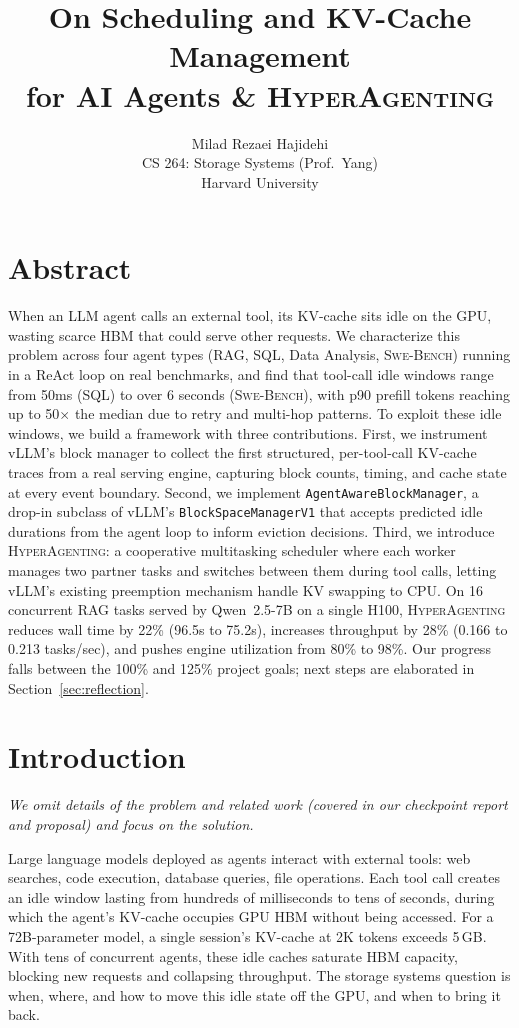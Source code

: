 \documentclass[10pt,twocolumn]{article}
\title{\vspace{-1.2cm}\textbf{On Scheduling and KV-Cache Management\\for AI Agents \& \textsc{HyperAgenting}}\vspace{-0.3cm}}
\author{Milad Rezaei Hajidehi\\ CS 264: Storage Systems (Prof.\ Yang) \\ Harvard University}
\date{}
\begin{document}
\maketitle
\thispagestyle{empty}

\section*{Abstract}

When an LLM agent calls an external tool, its KV-cache sits idle on the GPU, wasting scarce HBM that could serve other requests. We characterize this problem across four agent types (RAG, SQL, Data Analysis, \textsc{Swe-Bench}) running in a ReAct loop on real benchmarks, and find that tool-call idle windows range from 50ms (SQL) to over 6 seconds (\textsc{Swe-Bench}), with p90 prefill tokens reaching up to 50$\times$ the median due to retry and multi-hop patterns. To exploit these idle windows, we build a framework with three contributions. First, we instrument vLLM's block manager to collect the first structured, per-tool-call KV-cache traces from a real serving engine, capturing block counts, timing, and cache state at every event boundary. Second, we implement \texttt{AgentAwareBlockManager}, a drop-in subclass of vLLM's \texttt{BlockSpaceManagerV1} that accepts predicted idle durations from the agent loop to inform eviction decisions. Third, we introduce \textsc{HyperAgenting}: a cooperative multitasking scheduler where each worker manages two partner tasks and switches between them during tool calls, letting vLLM's existing preemption mechanism handle KV swapping to CPU. On 16 concurrent RAG tasks served by Qwen~2.5-7B on a single H100, \textsc{HyperAgenting} reduces wall time by 22\% (96.5s to 75.2s), increases throughput by 28\% (0.166 to 0.213 tasks/sec), and pushes engine utilization from 80\% to 98\%. Our progress falls between the 100\% and 125\% project goals; next steps are elaborated in Section~\ref{sec:reflection}.

\section{Introduction}

\emph{We omit details of the problem and related work (covered in our checkpoint report and proposal) and focus on the solution.}

Large language models deployed as agents interact with external tools: web searches, code execution, database queries, file operations. Each tool call creates an idle window lasting from hundreds of milliseconds to tens of seconds, during which the agent's KV-cache occupies GPU HBM without being accessed. For a 72B-parameter model, a single session's KV-cache at 2K tokens exceeds 5\,GB. With tens of concurrent agents, these idle caches saturate HBM capacity, blocking new requests and collapsing throughput. The storage systems question is when, where, and how to move this idle state off the GPU, and when to bring it back.
\end{document}
